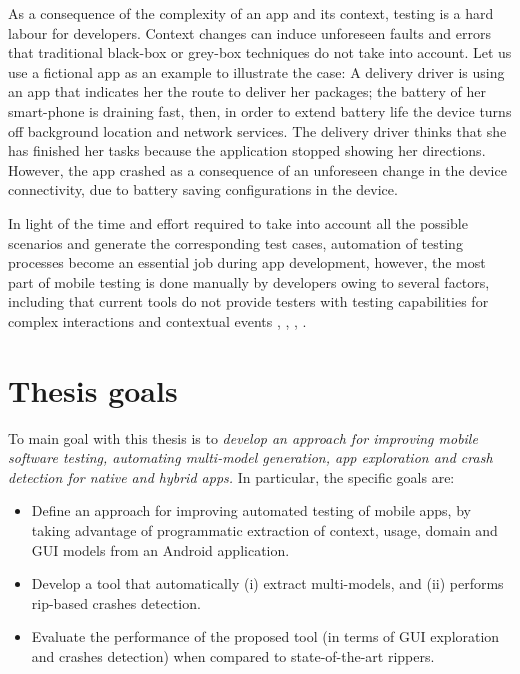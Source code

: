 As a consequence of the complexity of an app and its context, testing is a hard labour for developers. Context changes can induce unforeseen faults and errors that traditional black-box or grey-box techniques do not take into account. Let us use a fictional app as an example to illustrate the case: A delivery driver is using an app that indicates her the route to deliver her packages; the battery of her smart-phone is draining fast, then, in order to extend battery life the device turns off background location and network services. The delivery driver thinks that she has finished her tasks because the application stopped showing her directions. However, the app crashed as a consequence of an unforeseen change in the device connectivity, due to battery saving configurations in the device.

In light of the time and effort required to take into account all the possible scenarios and generate the corresponding test cases, automation of testing processes become an essential job during app development, however, the most part of mobile testing is done manually by developers owing to several factors, including that current
tools do not provide testers with testing capabilities for complex interactions and contextual events \cite{6681334}, \cite{linares-vasquez_bernal-cardenas_moran_poshyvanyk_2017}, \cite{kochhar_thung_nagappan_zimmermann_lo_2015}, \cite{linares-vasquez_moran_poshyvanyk_2017}. 




\section{Thesis goals}
To main goal with this thesis is to \emph{develop an approach for improving mobile software testing, automating multi-model generation, app exploration and crash detection for native and hybrid apps.} In particular, the specific goals are:
\begin{itemize}
	\item Define an approach for improving automated testing of mobile apps, by taking advantage of programmatic extraction of context, usage, domain and GUI models from an Android application.
	
	\item Develop a tool that automatically (i) extract multi-models, and (ii) performs rip-based crashes detection.
	
	\item Evaluate the performance of the proposed tool (in terms of GUI exploration and crashes detection) when compared to state-of-the-art rippers.
\end{itemize}

